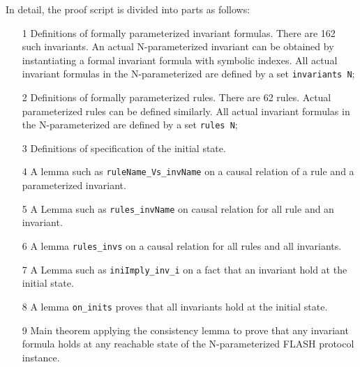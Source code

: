 \documentclass{llncs-new}
\begin{document}
In detail, the proof script is divided into   parts as follows:
\begin{enumerate}
\item[1] Definitions of formally parameterized invariant formulas.%
    There are 162 such invariants. An actual N-parameterized invariant can be obtained by instantiating a formal invariant formula with symbolic indexes. All   actual invariant formulas in the N-parameterized are defined by a set {\tt invariants N};

\item[2] Definitions of formally parameterized rules. There are 62 rules. %
    Actual parameterized rules can be defined similarly. All actual invariant formulas in the N-parameterized are defined by a set {\tt rules N};

\item[3]  Definitions of specification of the initial state. %

\item[4] A lemma  such as {\tt ruleName\_Vs\_invName} on a causal relation of a rule and a parameterized invariant. %


\item[5]  A  Lemma  such as {\tt rules\_invName} on causal relation for  all rule and an invariant.%


\item[6] A lemma {\tt rules\_invs} on a causal relation for all rules and all invariants. %

\item[7] A Lemma such as {\tt iniImply\_inv\_i} on a fact that an invariant  hold at the initial state. %

\item[8] A lemma {\tt on\_inits} proves that  all invariants hold at the initial state. %

\item[9] Main theorem  applying the consistency lemma to prove that any invariant formula  holds at any reachable state of the  N-parameterized FLASH protocol instance.
\end{enumerate}
\end{document}
